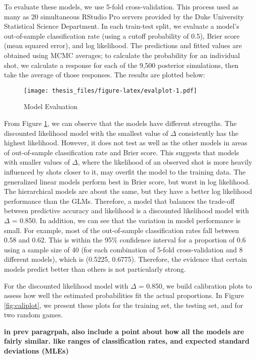 \documentclass[12pt,twoside]{dukestatscithesis}
\theoremstyle{definition}
\theoremstyle{definition}
\theoremstyle{definition}
\theoremstyle{remark}
\begin{document}
To evaluate these models, we use 5-fold cross-validation. This process
used as many as 20 simultaneous RStudio Pro servers provided by the Duke
University Statistical Science Department. In each train-test split, we
evaluate a model's out-of-sample classification rate (using a cutoff
probability of 0.5), Brier score (mean squared error), and log
likelihood. The predictions and fitted values are obtained using MCMC
averages; to calculate the probability for an individual shot, we
calculate a response for each of the 9,500 posterior simulations, then
take the average of those responses. The results are plotted below:
\begin{figure}[htbp]
\centering
\texttt{[image: thesis\_files/figure-latex/evalplot-1.pdf]}
\caption{\label{fig:evalplot}Model Evaluation}
\end{figure}
From Figure \ref{fig:evalplot}, we can observe that the models have
different strengths. The discounted likelihood model with the smallest
value of \(\Delta\) consistently has the highest likelihood. However, it
does not test as well as the other models in areas of out-of-sample
classification rate and Brier score. This suggests that models with
smaller values of \(\Delta\), where the likelihood of an observed shot
is more heavily influenced by shots closer to it, may overfit the model
to the training data. The generalized linear models perform best in
Brier score, but worst in log likelihood. The hierarchical models are
about the same, but they have a better log likelihood performance than
the GLMs. Therefore, a model that balances the trade-off between
predictive accuracy and likelihood is a discounted likelihood model with
\(\Delta\) = 0.850. In addition, we can see that the variation in model
performance is small. For example, most of the out-of-sample
classification rates fall between 0.58 and 0.62. This is within the 95\%
confidence interval for a proportion of 0.6 using a sample size of 40
(for each combination of 5-fold cross-validation and 8 different
models), which is (0.5225, 0.6775). Therefore, the evidence that certain
models predict better than others is not particularly strong.

For the discounted likelihood model with \(\Delta\) = 0.850, we build
calibration plots to assess how well the estimated probabilities fit the
actual proportions. In Figure \ref{fig:caliplot}, we present these plots
for the training set, the testing set, and for two random games.

\textbf{in prev paragrpah, also include a point about how all the models
are fairly similar. like ranges of classification rates, and expected
standard deviations (MLEs)}
\end{document}
